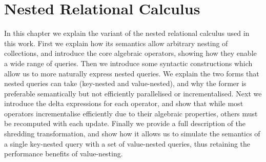 \chapter{Nested Relational Calculus} \label{nrc}

In this chapter we explain the variant of the nested relational calculus used in this work.
First we explain how its semantics allow arbitrary nesting of collections, and introduce the core algebraic operators, showing how they enable a wide range of queries. Then we introduce some syntactic constructions which allow us to more naturally express nested queries. We explain the two forms that nested queries can take (key-nested and value-nested), and why the former is preferable semantically but not efficiently parallelised or incrementalised. Next we introduce the delta expressions for each operator, and show that while most operators incrementalise efficiently due to their algebraic properties, others must be recomputed with each update. Finally we provide a full description of the shredding transformation, and show how it allows us to simulate the semantics of a single key-nested query with a set of value-nested queries, thus retaining the performance benefits of value-nesting.


